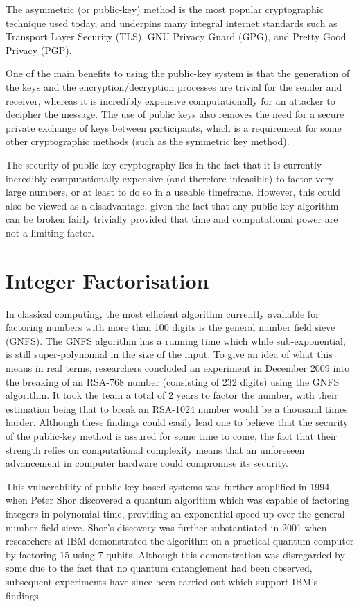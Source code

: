 \documentclass[runningheads,a4paper]{llncs}
\begin{document}
The asymmetric (or public-key) method is the most popular cryptographic technique used today, and underpins many integral internet standards such as Transport Layer Security (TLS), GNU Privacy Guard (GPG), and Pretty Good Privacy (PGP).

One of the main benefits to using the public-key system is that the generation of the keys and the encryption/decryption processes are trivial for the sender and receiver, whereas it is incredibly expensive computationally for an attacker to decipher the message. The use of public keys also removes the need for a secure private exchange of keys between participants, which is a requirement for some other cryptographic methods (such as the symmetric key method).

The security of public-key cryptography lies in the fact that it is currently incredibly computationally expensive (and therefore infeasible) to factor very large numbers, or at least to do so in a useable timeframe. However, this could also be viewed as a disadvantage, given the fact that any public-key algorithm can be broken fairly trivially provided that time and computational power are not a limiting factor.

\section{Integer Factorisation}

In classical computing, the most efficient algorithm currently available for factoring numbers with more than 100 digits is the general number field sieve (GNFS). The GNFS algorithm has a running time which while sub-exponential, is still super-polynomial in the size of the input. To give an idea of what this means in real terms, researchers concluded an experiment in December 2009 into the breaking of an RSA-768 number (consisting of 232 digits) using the GNFS algorithm. It took the team a total of 2 years to factor the number, with their estimation being that to break an RSA-1024 number would be a thousand times harder\cite{Kleinjung:2010:FRM:1881412.1881436}. Although these findings could easily lead one to believe that the security of the public-key method is assured for some time to come, the fact that their strength relies on computational complexity means that an unforeseen advancement in  computer hardware could compromise its security.

This vulnerability of public-key based systems was further amplified in 1994, when Peter Shor discovered a quantum algorithm which was capable of factoring integers in polynomial time, providing an exponential speed-up over the general number field sieve\cite{Shor:1994fk}. Shor's discovery was further substantiated in 2001 when researchers at IBM demonstrated the algorithm on a practical quantum computer by factoring 15 using 7 qubits\cite{Vandersypen:2001fk}. Although this demonstration was disregarded by some due to the fact that no quantum entanglement had been observed, subsequent experiments have since been carried out which support IBM's findings\cite{Lu:2007uq}.
\end{document}

